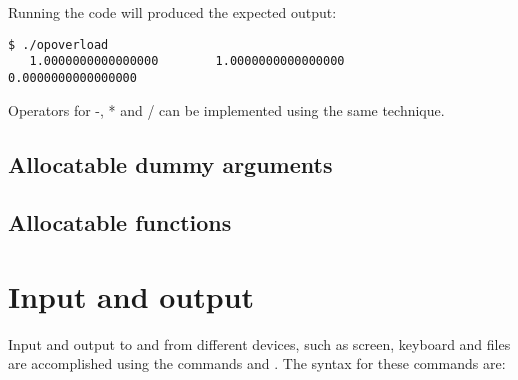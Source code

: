 Running the code will produced the expected output:

\cmdmode

\begin{lstlisting}
$ ./opoverload 
   1.0000000000000000        1.0000000000000000        0.0000000000000000    
\end{lstlisting}%

\fmode

Operators for -, * and / can be implemented using the same technique.

\subsection{Allocatable dummy arguments}



\subsection{Allocatable functions}




%
%
%

\section{Input and output}

Input and output to and from different devices, such as screen, keyboard and files are accomplished using the commands  and . The syntax for these commands are:

